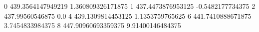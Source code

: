 0 439.3564147949219 1.360809326171875
1 437.4473876953125 -0.5482177734375
2 437.99560546875 0.0
4 439.1309814453125 1.1353759765625
6 441.7410888671875 3.7454833984375
8 447.90960693359375 9.91400146484375
